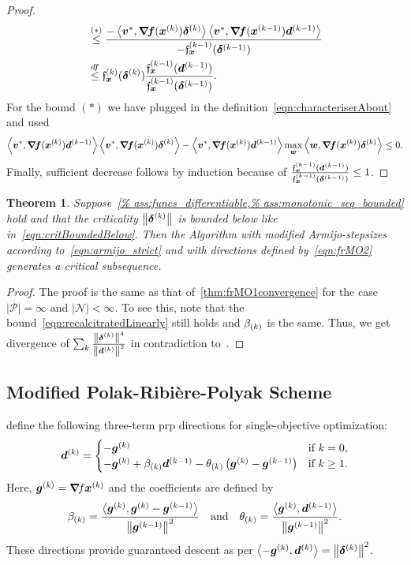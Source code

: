 \documentclass{article}
\theoremstyle{plain}
\newtheorem{theorem}{Theorem}
\theoremstyle{definition}
\begin{document}
\begin{proof}
\begin{align*}
		&\stackrel{(*)}\leq
		\frac{-
		\left\langle \bm{v}^*, \bm{\nabla}\!\bm{f}(\bm{x}^{(k)})\bm{\delta}^{(k)} \right\rangle
		\left\langle \bm{v}^*, \bm{\nabla}\!\bm{f}(\bm{x}^{(k-1)})\bm{d}^{(k-1)} \right\rangle
		}{
			-\mathfrak{f}_{\bm{x}}^{(k-1)}(\bm{\delta}^{(k-1)})
		}
		\\
		&\stackrel{df}\leq
		\mathfrak{f}_{\bm{x}}^{(k)}(\bm{\delta}^{(k)})
		\frac{
			\mathfrak{f}_{\bm{x}}^{(k-1)}(\bm{d}^{(k-1)})
		}{
			\mathfrak{f}_{\bm{x}}^{(k-1)}(\bm{\delta}^{(k-1)})
		}
		.
	\end{align*}
	For the bound $(*)$ we have plugged in the 
	definition~\eqref{eqn:characteriserAbout} and used
	$$
	\left\langle \bm{v}^*, \bm{\nabla}\!\bm{f}(\bm{x}^{(k)})\bm{d}^{(k-1)} \right\rangle
	\left\langle \bm{v}^*, \bm{\nabla}\!\bm{f}(\bm{x}^{(k)})\bm{\delta}^{(k)} \right\rangle
	-
	\left\langle \bm{v}^*, \bm{\nabla}\!\bm{f}(\bm{x}^{(k)})\bm{d}^{(k-1)} \right\rangle
	\max_{\bm{w}}\left\langle \bm{w}, \bm{\nabla}\!\bm{f}(\bm{x}^{(k)})\bm{\delta}^{(k)} \right\rangle
	\leq 0.
	$$
	Finally, sufficient decrease follows by induction
	because of $\frac{\mathfrak{f}_{\bm{x}}^{(k-1)}(\bm{d}^{(k-1)})}{\mathfrak{f}_{\bm{x}}^{(k-1)}(\bm{\delta}^{(k-1)})}\leq 1$.
\end{proof}

\begin{theorem}
	Suppose~\cref{%
	ass:funcs_differentiable,%
	ass:monotonic_seq_bounded}
	hold and that the criticality $\left\|\bm{\delta}^{(k)}\right\|$ is 
	bounded below like in~\eqref{eqn:critBoundedBelow}.
	Then the Algorithm with modified Armijo-stepsizes
	according to~\eqref{eqn:armijo_strict} and with directions defined
	by~\eqref{eqn:frMO2} generates a critical subsequence.
\end{theorem}

\begin{proof}
	The proof is the same as 
	that of~\cref{thm:frMO1convergence} for 
	the case $|\mathcal P|= \infty$ and $|\mathcal N|<\infty$.
	To see this, note that the bound~\eqref{eqn:recalcitratedLinearly}
	still holds and $\beta_{(k)}$ is the same.
	Thus, we get divergence of $\sum_{k} \frac{\left\|\bm{\delta}^{(k)}\right\|^4}{\left\|\bm{d}^{(k)}\right\|^2}$
	in contradiction to~.	
\end{proof}

\subsection{Modified Polak-Ribière-Polyak Scheme}
\citet{zhangDescentModifiedPolak2006}
define the following three-term \ac{prp} directions for 
single-objective optimization:
$$
\bm{d}^{(k)} 
= 
\begin{cases}
	-\bm{g}^{(k)}
		&\text{if $k=0$,}
	\\
	-\bm{g}^{(k)}
	+ \beta_{(k)}
	\bm{d}^{(k-1)}
	- \theta_{(k)}
	\left(
		\bm{g}^{(k)} - \bm{g}^{(k-1)}
		\right)
	&\text{if $k\geq1 $.}
\end{cases}
$$
Here, $\bm{g}^{(k)} = \bm{\nabla}\!f{\bm{x}^{(k)}}$ and the coefficients are defined by
\begin{equation*}
	\beta_{(k)} = 
	\frac{
		\left\langle \bm{g}^{(k)}, \bm{g}^{(k)}-\bm{g}^{(k-1)} \right\rangle
	}{
		\left\|\bm{g}^{(k-1)}\right\|^2
	}
	\quad\text{and}\quad
	\theta_{(k)}
	=
	\frac{
		\left\langle \bm{g}^{(k)}, \bm{d}^{(k-1)} \right\rangle
	}
	{
		\left\|\bm{g}^{(k-1)}\right\|^2
	}.
\end{equation*}
These directions provide guaranteed descent as per
$\left\langle -\bm{g}^{(k)}, \bm{d}^{(k)} \right\rangle = \left\|\bm{\delta}^{(k)}\right\|^2$.
\end{document}
